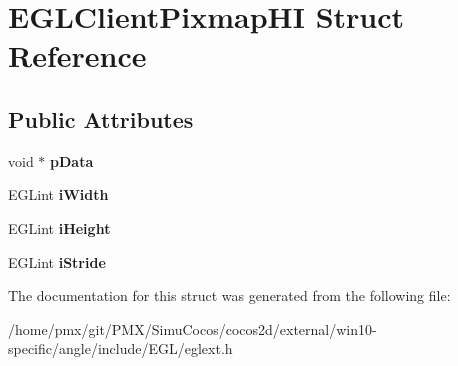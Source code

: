 \hypertarget{structEGLClientPixmapHI}{}\section{E\+G\+L\+Client\+Pixmap\+HI Struct Reference}
\label{structEGLClientPixmapHI}
\subsection*{Public Attributes}
\begin{DoxyCompactItemize}
\item 
\mbox{\label{structEGLClientPixmapHI_a0828a3df1582f6b861bab67818c537a9}} 
void $\ast$ {\bfseries p\+Data}
\item 
\mbox{\label{structEGLClientPixmapHI_a90346094b9696ba370824167d60d8217}} 
E\+G\+Lint {\bfseries i\+Width}
\item 
\mbox{\label{structEGLClientPixmapHI_a963f9b039c1f92713b9849f006a62241}} 
E\+G\+Lint {\bfseries i\+Height}
\item 
\mbox{\label{structEGLClientPixmapHI_ab89de5b8de06f1886a3d86d8ec6794b2}} 
E\+G\+Lint {\bfseries i\+Stride}
\end{DoxyCompactItemize}


The documentation for this struct was generated from the following file\+:\begin{DoxyCompactItemize}
\item 
/home/pmx/git/\+P\+M\+X/\+Simu\+Cocos/cocos2d/external/win10-\/specific/angle/include/\+E\+G\+L/eglext.\+h\end{DoxyCompactItemize}
